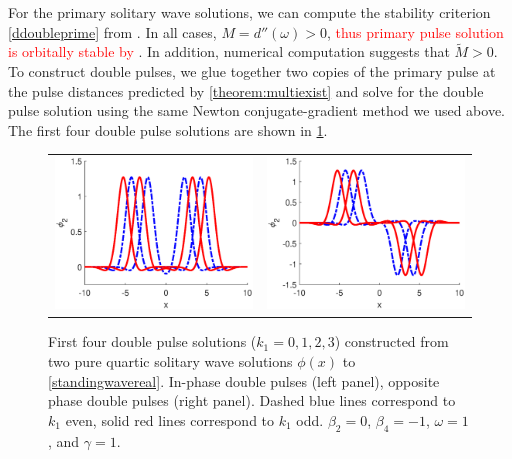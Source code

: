 \documentclass[12pt]{elsarticle}
\newcommand{\revised}[1]{ \textcolor{red}{#1} }
\begin{document}
For the primary solitary wave solutions, we can compute the stability criterion \cref{ddoubleprime} from \cite{Grillakis1987}. In all cases, $M = d''(\omega) > 0$, \revised{thus primary pulse solution is orbitally stable by \cite[Theorem 3.5]{Grillakis1987}}. In addition, numerical computation suggests that $\tilde{M} > 0$. To construct double pulses, we glue together two copies of the primary pulse at the pulse distances predicted by \cref{theorem:multiexist} and solve for the double pulse solution using the same Newton conjugate-gradient method we used above. The first four double pulse solutions are shown in \cref{fig:doublepulses}. 
\begin{figure}[H]
\centering
\begin{tabular}{cc}
\includegraphics[width=8cm]{images/DPplus.eps} &
\includegraphics[width=8cm]{images/DPminus.eps}
\end{tabular}
\caption{First four double pulse solutions ($k_1 = 0, 1, 2, 3$) constructed from two pure quartic solitary wave solutions $\phi(x)$ to \cref{standingwavereal}. In-phase double pulses (left panel), opposite phase double pulses (right panel). Dashed blue lines correspond to $k_1$ even, solid red lines correspond to $k_1$ odd. $\beta_2 = 0$, $\beta_4 = -1$, $\omega = 1$, and $\gamma = 1$. }
\label{fig:doublepulses}
\end{figure} 
\end{document}
